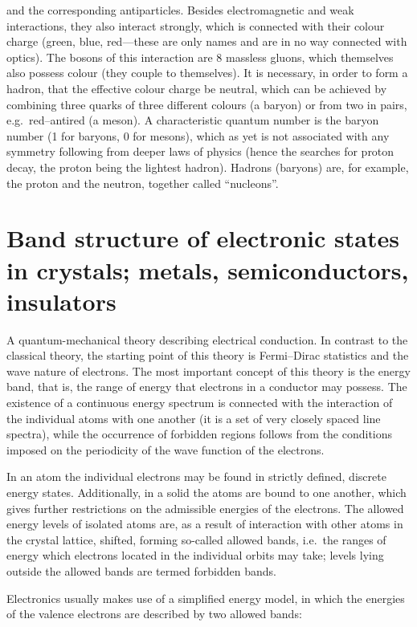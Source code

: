 and the corresponding antiparticles. Besides electromagnetic and weak interactions, they also interact strongly, which is connected with their colour charge (green, blue, red---these are only names and are in no way connected with optics). The bosons of this interaction are 8 massless gluons, which themselves also possess colour (they couple to themselves). It is necessary, in order to form a hadron, that the effective colour charge be neutral, which can be achieved by combining three quarks of three different colours (a baryon) or from two in pairs, e.g.\ red--antired (a meson). A characteristic quantum number is the baryon number (1 for baryons, 0 for mesons), which as yet is not associated with any symmetry following from deeper laws of physics (hence the searches for proton decay, the proton being the lightest hadron). Hadrons (baryons) are, for example, the proton and the neutron, together called ``nucleons''.

\section{Band structure of electronic states in crystals; metals, semiconductors, insulators}

A quantum-mechanical theory describing electrical conduction. In contrast to the classical theory, the starting point of this theory is Fermi--Dirac statistics and the wave nature of electrons. The most important concept of this theory is the energy band, that is, the range of energy that electrons in a conductor may possess. The existence of a continuous energy spectrum is connected with the interaction of the individual atoms with one another (it is a set of very closely spaced line spectra), while the occurrence of forbidden regions follows from the conditions imposed on the periodicity of the wave function of the electrons.

In an atom the individual electrons may be found in strictly defined, discrete energy states. Additionally, in a solid the atoms are bound to one another, which gives further restrictions on the admissible energies of the electrons. The allowed energy levels of isolated atoms are, as a result of interaction with other atoms in the crystal lattice, shifted, forming so-called allowed bands, i.e.\ the ranges of energy which electrons located in the individual orbits may take; levels lying outside the allowed bands are termed forbidden bands.

Electronics usually makes use of a simplified energy model, in which the energies of the valence electrons are described by two allowed bands:

